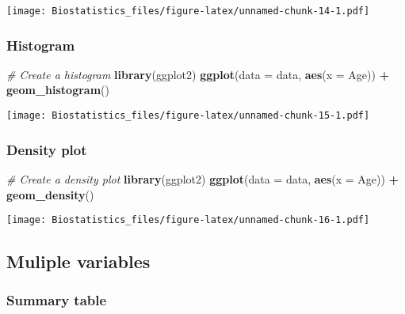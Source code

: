 \documentclass[]{book}
\newenvironment{Shaded}{\begin{snugshade}}{\end{snugshade}}
\newcommand{\KeywordTok}[1]{\textcolor[rgb]{0.13,0.29,0.53}{\textbf{#1}}}
\newcommand{\DataTypeTok}[1]{\textcolor[rgb]{0.13,0.29,0.53}{#1}}
\newcommand{\StringTok}[1]{\textcolor[rgb]{0.31,0.60,0.02}{#1}}
\newcommand{\CommentTok}[1]{\textcolor[rgb]{0.56,0.35,0.01}{\textit{#1}}}
\newcommand{\OperatorTok}[1]{\textcolor[rgb]{0.81,0.36,0.00}{\textbf{#1}}}
\newcommand{\NormalTok}[1]{#1}
\theoremstyle{definition}
\theoremstyle{definition}
\theoremstyle{definition}
\theoremstyle{remark}
\begin{document}
\texttt{[image: Biostatistics\_files/figure-latex/unnamed-chunk-14-1.pdf]}

\subsubsection{Histogram}\label{histogram}

\begin{Shaded}
\begin{Highlighting}[]
\CommentTok{# Create a histogram}
\KeywordTok{library}\NormalTok{(ggplot2)}
\KeywordTok{ggplot}\NormalTok{(}\DataTypeTok{data =}\NormalTok{ data, }\KeywordTok{aes}\NormalTok{(}\DataTypeTok{x =}\NormalTok{ Age)) }\OperatorTok{+}
\StringTok{  }\KeywordTok{geom_histogram}\NormalTok{()}
\end{Highlighting}
\end{Shaded}

\texttt{[image: Biostatistics\_files/figure-latex/unnamed-chunk-15-1.pdf]}

\subsubsection{Density plot}\label{density-plot}

\begin{Shaded}
\begin{Highlighting}[]
\CommentTok{# Create a density plot}
\KeywordTok{library}\NormalTok{(ggplot2)}
\KeywordTok{ggplot}\NormalTok{(}\DataTypeTok{data =}\NormalTok{ data, }\KeywordTok{aes}\NormalTok{(}\DataTypeTok{x =}\NormalTok{ Age)) }\OperatorTok{+}
\StringTok{  }\KeywordTok{geom_density}\NormalTok{()}
\end{Highlighting}
\end{Shaded}

\texttt{[image: Biostatistics\_files/figure-latex/unnamed-chunk-16-1.pdf]}

\subsection{Muliple variables}\label{muliple-variables}

\subsubsection{Summary table}\label{summary-table}

\begin{Shaded}
\end{Shaded}
\end{document}
